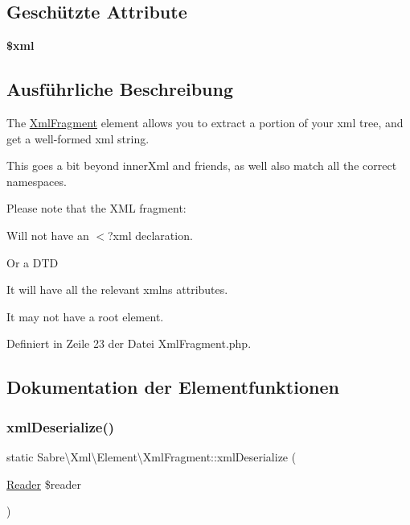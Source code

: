 \subsection*{Geschützte Attribute}
\begin{DoxyCompactItemize}
\item 
\mbox{\label{class_sabre_1_1_xml_1_1_element_1_1_xml_fragment_adfa7791a9a6eb897ab7170d2ae1eedc5}} 
{\bfseries \$xml}
\end{DoxyCompactItemize}


\subsection{Ausführliche Beschreibung}
The \mbox{\hyperlink{class_sabre_1_1_xml_1_1_element_1_1_xml_fragment}{Xml\+Fragment}} element allows you to extract a portion of your xml tree, and get a well-\/formed xml string.

This goes a bit beyond {\ttfamily inner\+Xml} and friends, as we\textquotesingle{}ll also match all the correct namespaces.

Please note that the X\+ML fragment\+:


\begin{DoxyEnumerate}
\item Will not have an $<$?xml declaration.
\item Or a D\+TD
\item It will have all the relevant xmlns attributes.
\item It may not have a root element. 
\end{DoxyEnumerate}

Definiert in Zeile 23 der Datei Xml\+Fragment.\+php.



\subsection{Dokumentation der Elementfunktionen}
\mbox{\label{class_sabre_1_1_xml_1_1_element_1_1_xml_fragment_a91fd5741f54051de0eeb6779d7d7917f}} 
\subsubsection{\texorpdfstring{xml\+Deserialize()}{xmlDeserialize()}}
{\footnotesize\ttfamily static Sabre\textbackslash{}\+Xml\textbackslash{}\+Element\textbackslash{}\+Xml\+Fragment\+::xml\+Deserialize (\begin{DoxyParamCaption}\item[{\mbox{\hyperlink{class_sabre_1_1_xml_1_1_reader}{Reader}}}]{\$reader }\end{DoxyParamCaption})\hspace{0.3cm}{\ttfamily [static]}}

